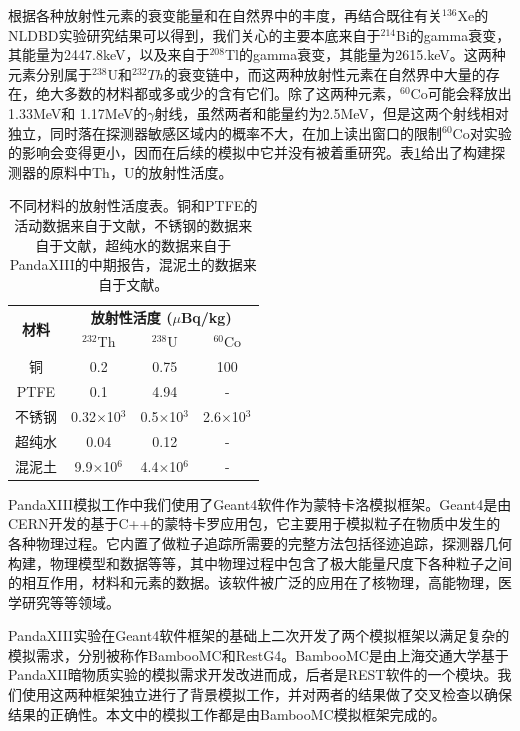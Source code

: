 根据各种放射性元素的衰变能量和在自然界中的丰度，再结合既往有关$^{136}$Xe的
NLDBD实验研究结果可以得到，我们关心的主要本底来自于$^{214}$Bi的gamma衰变，其能量为2447.8keV，以及来自于$^{208}$Tl的gamma衰变，其能量为2615.keV。这两种元素分别属于$^{238}$U和$^{232}Th$的衰变链中，而这两种放射性元素在自然界中大量的存在，绝大多数的材料都或多或少的含有它们。除了这两种元素，$^{60}$Co可能会释放出1.33MeV和
1.17MeV的$\gamma$射线，虽然两者和能量约为2.5MeV，但是这两个射线相对独立，同时落在探测器敏感区域内的概率不大，在加上读出窗口的限制$^{60}$Co对实验的影响会变得更小，因而在后续的模拟中它并没有被着重研究。表\ref{tab:activities}给出了构建探测器的原料中Th，U的放射性活度。
\renewcommand\arraystretch{1.4}
\begin{table}[tbh]
    \centering
    \begin{tabular*}{0.75\textwidth}{@{\extracolsep{\fill}}cccc}
        \hline
        \hline
        \multirow{2}{*}{\textbf{材料}} & \multicolumn{3}{c}{\textbf{放射性活度 ($\mu$Bq/kg)}}\\
            & $^{232}$Th & $^{238}$U  & $^{60}$Co \\ \hline
        铜      & 0.2        &   0.75     &     100     \\
        PTFE    & 0.1        &   4.94      &    -      \\
        不锈钢  & 0.32$\times$10$^3$          &    0.5$\times$10$^3$      &     2.6$\times$10$^3$     \\
        超纯水  & 0.04          &     0.12      &     -     \\
        混泥土  & 9.9$\times$10$^6$          &    4.4$\times$10$^6$   &    -    \\
        \hline
        \hline
    \end{tabular*}
    \caption{不同材料的放射性活度表。铜和PTFE的活动数据来自于文献\cite{Abgrall:2016cct}，不锈钢的数据来自于文献\cite{LZ_CDR}，超纯水的数据来自于PandaXIII的中期报告\cite{cdr}，混泥土的数据来自于文献\cite{Zeng2014}。}
    \label{tab:activities}
  \end{table}
  

PandaXIII模拟工作中我们使用了Geant4软件作为蒙特卡洛模拟框架。Geant4是由
CERN开发的基于C++的蒙特卡罗应用包，它主要用于模拟粒子在物质中发生的各种物理过程。它内置了做粒子追踪所需要的完整方法包括径迹追踪，探测器几何构建，物理模型和数据等等，其中物理过程中包含了极大能量尺度下各种粒子之间的相互作用，材料和元素的数据。该软件被广泛的应用在了核物理，高能物理，医学研究等等领域。

PandaXIII实验在Geant4软件框架的基础上二次开发了两个模拟框架以满足复杂的模拟需求，分别被称作BambooMC和RestG4。BambooMC是由上海交通大学基于
PandaXII暗物质实验的模拟需求开发改进而成，后者是REST软件\supercite{tomas2013development}的一个模块。我们使用这两种框架独立进行了背景模拟工作，并对两者的结果做了交叉检查以确保结果的正确性。本文中的模拟工作都是由BambooMC模拟框架完成的。


